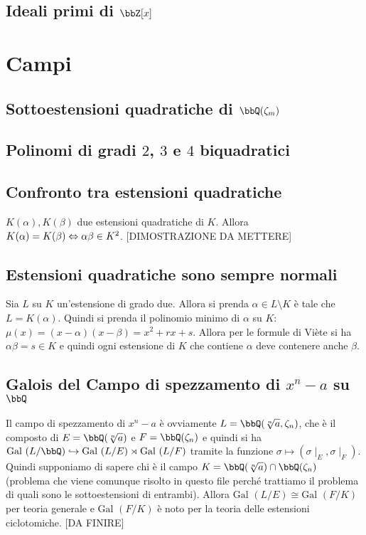 \documentclass[a4paper,NoNotes,GeneralMath]{stdmdoc}
\newcommand{\Gal}{\text{Gal }}
\begin{document}
	\subsection{Ideali primi di $\bbZ[x]$}
	
	\section{Campi}
	\subsection{Sottoestensioni quadratiche di $\bbQ(\zeta_m)$}
	
	\subsection{Polinomi di gradi $2$, $3$ e $4$ biquadratici}
	
	\subsection{Confronto tra estensioni quadratiche}
	$K(\alpha), K(\beta)$ due estensioni quadratiche di $K$. Allora $K(\alpha) = K(\beta) \Leftrightarrow \alpha\beta \in K^2$.
	[DIMOSTRAZIONE DA METTERE]
	
	\subsection{Estensioni quadratiche sono sempre normali}
	Sia $L$ su $K$ un'estensione di grado due. Allora si prenda $\alpha \in L \setminus K$ è tale che $L = K(\alpha)$. Quindi si prenda il polinomio minimo di $\alpha$ su $K$: $\mu(x) = (x-\alpha)(x-\beta) = x^2 + rx + s$. Allora per le formule di Viète si ha $\alpha\beta = s \in K$ e quindi ogni estensione di $K$ che contiene $\alpha$ deve contenere anche $\beta$.
	
	\subsection{Galois del Campo di spezzamento di $x^n - a$ su $\bbQ$}
	Il campo di spezzamento di $x^n - a$ è ovviamente $L = \bbQ(\sqrt[n]{a}, \zeta_n)$, che è il composto di $E = \bbQ(\sqrt[n]{a})$ e $F = \bbQ(\zeta_n)$ e quindi si ha $\Gal(L/\bbQ) \hookrightarrow \Gal(L/E) \rtimes \Gal(L/F)$ tramite la funzione $\sigma \mapsto (\sigma\mid_E, \sigma\mid_F)$. Quindi supponiamo di sapere chi è il campo $K = \bbQ(\sqrt[n]{a}) \cap \bbQ(\zeta_n)$ (problema che viene comunque risolto in questo file perché trattiamo il problema di quali sono le sottoestensioni di entrambi). Allora $\Gal(L/E) \cong \Gal(F/K)$ per teoria generale e $\Gal(F/K)$ è noto per la teoria delle estensioni ciclotomiche.
	[DA FINIRE]
	
\end{document}
